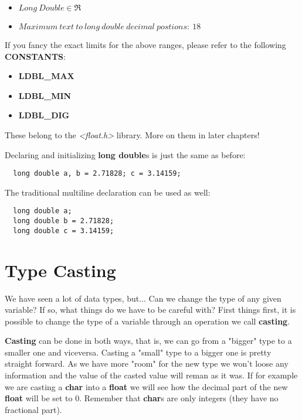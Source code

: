 \documentclass[12pt]{book}
\begin{document}
\begin{itemize}
  \item $Long\ Double \in \Re$
  \item $Maximum\ text\ to\ long\ double\ decimal\ postions:\ 18$
\end{itemize}

If you fancy the exact limits for the above ranges, please refer to the following \textbf{CONSTANTS}:

\begin{itemize}
  \item \textbf{LDBL\_MAX}
  \item \textbf{LDBL\_MIN}
  \item \textbf{LDBL\_DIG}
\end{itemize}

These belong to the \textit{\textless float.h\textgreater} library. More on them in later chapters!

Declaring and initializing \textbf{long double}s is just the same as before:

\begin{verbatim}
  long double a, b = 2.71828; c = 3.14159;
\end{verbatim}

The traditional multiline declaration can be used as well:

\begin{verbatim}
  long double a;
  long double b = 2.71828;
  long double c = 3.14159;
\end{verbatim}

\section{Type Casting}

We have seen a lot of data types, but... Can we change the type of any given variable? If so, what things do we have to be careful with? First things first, it is possible to change the type of a variable through an operation we call \textbf{casting}.

\textbf{Casting} can be done in both ways, that is, we can go from a "bigger" type to a smaller one and viceversa. Casting a "small" type to a bigger one is pretty straight forward. As we have more "room" for the new type we won't loose any information and the value of the casted value will reman as it was. If for example we are casting a \textbf{char} into a \textbf{float} we will see how the decimal part of the new \textbf{float} will be set to 0. Remember that \textbf{char}s are only integers (they have no fractional part).
\end{document}
